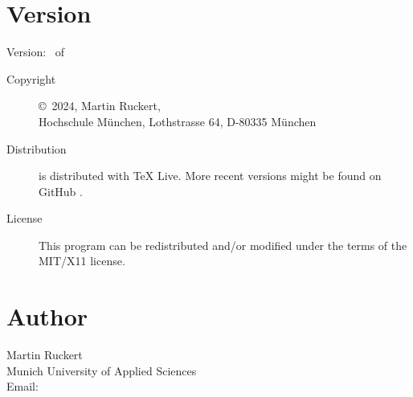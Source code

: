 \documentclass[a4paper,english]{article}
\begin{document}
\section{Version}
Version: \Version\  of \Date
\begin{description}
\item[Copyright] \copyright\ 2024, Martin Ruckert,\\
     Hochschule München, Lothstrasse 64, D-80335 München

\item[Distribution]
   is distributed with TeX Live.
  More recent versions might be found on GitHub
  .

\item[License] This program can be redistributed and/or modified under the
  terms of the MIT/X11 license.
\end{description}

\section{Author}
\noindent
Martin Ruckert                        \\
Munich University of Applied Sciences \\
Email:   \\
\end{document}
